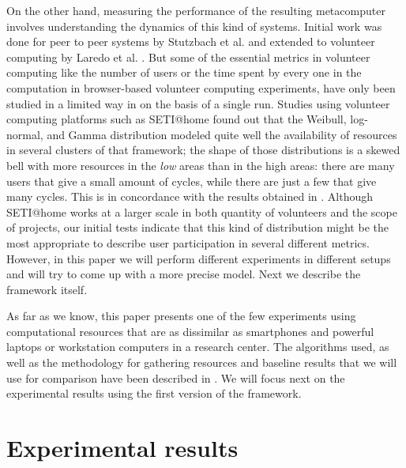 \documentclass[journal,onecolumn]{IEEEtran}
\begin{document}
On the other hand, measuring the performance of the resulting metacomputer
involves understanding the dynamics of this kind of systems. Initial
work was done for peer to peer systems by Stutzbach et
al. \cite{stutzbach2006understanding} and extended to volunteer
computing by Laredo et al. \cite{churn08,laredo2008rcp}. 
But some of the essential metrics in volunteer computing like the
number of users or the time spent by every one in the
computation in browser-based volunteer computing experiments, have
only been studied in a limited way in 
\cite{DBLP:journals/gpem/LaredoBGVAGF14} on the basis of a single
run. Studies using volunteer computing platforms such as SETI@home
\cite{javadi2009mining} found out that the Weibull, log-normal, and
Gamma distribution 
modeled quite well the availability of resources in several clusters
of that framework; the shape of those distributions is a skewed bell
with more resources in the {\em low} areas than in the high areas:
there are many users that give a small amount of cycles, while there
are just a few that give many cycles. This is in concordance with the
results obtained in \cite{agajaj}. Although SETI@home works
at a larger scale in both quantity of volunteers and the scope of projects, 
our initial tests indicate that
this kind of distribution might be the most appropriate to describe
user participation in several different metrics. However, in this
paper we will perform different experiments in different setups and
will try to come up with a more precise model. Next we describe the
framework itself.


As far as we know, this paper presents one of the few experiments using %
computational resources that are as dissimilar as smartphones and
powerful laptops 
or workstation computers in a research center. 
The algorithms used, as well as the methodology 
for gathering resources and baseline results that we will use for
comparison have been described in
\cite{2016arXiv160101607M}. We will focus next on the experimental
results using the first version of the framework. 


\section{Experimental results}
\label{sec:exp1}
\end{document}
